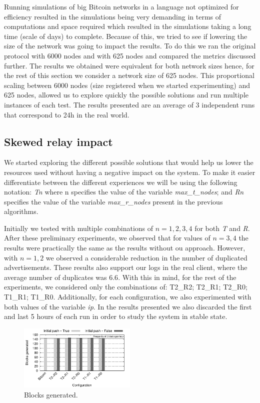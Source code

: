 \documentclass{dads}   %
\begin{document}
Running simulations of big Bitcoin networks in a language not optimized for efficiency resulted in the simulations being very demanding in terms of computations and space required which resulted in the simulations taking a long time (scale of days) to complete. Because of this, we tried to see if lowering the size of the network was going to impact the results. To do this we ran the original protocol with 6000 nodes and with 625 nodes and compared the metrics discussed further. The results we obtained were equivalent for both network sizes hence, for the rest of this section we consider a network size of 625 nodes. This proportional scaling between 6000 nodes (size registered when we started experimenting) and 625 nodes, allowed us to explore quickly the possible solutions and run multiple instances of each test. The results presented are an average of 3 independent runs that correspond to 24h in the real world.


\subsection{Skewed relay impact}
We started exploring the different possible solutions that would help us lower the resources used without having a negative impact on the system. To make it easier differentiate between the different experiences we will be using the following notation: \textsl{Tn} where n specifies the value of the variable \textsl{max\_t\_nodes}; and \textsl{Rn} specifies the value of the variable \textsl{max\_r\_nodes} present in the previous algorithms.

Initially we tested with multiple combinations of $n={1,2,3,4}$ for both \textsl{T} and \textsl{R}. After these preliminary experiments, we observed that for values of $n={3,4}$ the results were practically the same as the results without ou approach. However, with $n={1,2}$ we observed a considerable reduction in the number of duplicated advertisements.
These results also support our logs in the real client, where the average number of duplicates was $6.6$. With this in mind, for the rest of the experiments, we considered only the combinations of: T2\_R2; T2\_R1; T2\_R0; T1\_R1; T1\_R0. Additionally, for each configuration, we also experimented with both values of the variable \textsl{ip}. In the results presented we also discarded the first and last 5 hours of each run in order to study the system in stable state.


\begin{figure}
\centering
\includegraphics[width=0.5\textwidth]{plots/blocks-gen.pdf}
\caption{Blocks generated.}
\label{fig:nb-blocks}
\end{figure}
\end{document}
